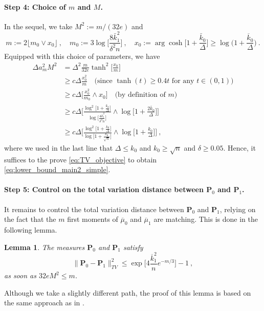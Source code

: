 \documentclass[twoside,11pt]{article}
\newtheorem{lem}{Lemma}
\def\beq{\begin{equation}}
\def\eeq{\end{equation}}
\newcommand{\<}{\langle}
\renewcommand{\>}{\rangle}
\begin{document}
\paragraph{Step 4: Choice of $m$ and $M$.}



In the sequel, we take $M^2:=m/(32 e)$ and 
\beq\label{eq:choiseM_k0_grand}
m:= 2 \lfloor m_0\vee x_0\rfloor \ , \quad  m_0 := 3\log\Big[\frac{8  \bar{k}^2_1}{\delta^2  n} \Big]\ ,\quad x_0:= \arg\cosh\big[1+ \frac{\bar{k}_0}{\Delta}\Big]\geq \log\big(1+\frac{\overline{k}_0}{\Delta}\big)\ . 
\eeq
Equipped with this choice of parameters, we have
\begin{align*}
\Delta a^2_{m}M^2&=  \Delta^2 \frac{m}{32e}\tanh^2\big[\frac{x_0}{m}\big]\nonumber\\
&\geq  c \Delta \frac{x^2_0}{m} \quad \text{(since $\tanh(t)\geq 0.4 t$ for any $t\in (0,1)$)}\nonumber\\
&\geq  c \Delta \big[\frac{x_0^2}{m_0}\wedge x_0\big]\quad \text{(by definition of $m$)}\nonumber\\
&\geq  c\Delta \Big[\frac{\log^2\big[1+  \frac{\overline{k}_0}{\Delta}\big]}{\log\big[ \frac{4  \overline{k}^2_1}{\delta^2  n}\big]}\wedge \log\big[1+ \frac{2\overline{k}_0}{\Delta}\big] \Big] \nonumber\\
&\geq  c\Delta \Big[\frac{\log^2\big[1+  \frac{k_0}{\Delta}\big]}{\log\big[1+ \frac{k_0}{ \sqrt{n}}\big]}\wedge \log\big[1+ \frac{k_0}{\Delta}\big] \Big]\ ,\label{eq.parmchoice}
\end{align*}
where we used in the last line that $\Delta\leq k_0$ and $k_0\geq \sqrt{n}$ and $\delta\geq 0.05$. Hence, it suffices to the prove \eqref{eq:TV_objective} to obtain  \eqref{eq:lower_bound_main2_simple}.




















\paragraph{Step 5: Control on the total variation distance between $\mathbf  P_0$ and $\mathbf  P_1$.}

It remains to control the total variation distance between $\mathbf  P_0$ and $\mathbf  P_1$, relying on the fact that the $m$ first moments of $\overline{\mu}_0$ and $\overline{\mu}_1$ are matching. This is done in the following lemma. 
\begin{lem}\label{lem:upper_total_variation_distance}
The measures ${\mathbf P}_0$ and ${\mathbf P}_1$ satisfy
\beq
\|{\mathbf P}_0 - {\mathbf P}_1\|_{TV}^2 \leq  \exp\Big[4\frac{ \overline{k}_1^2}{ n} e^{-m/3}\Big] - 1\ ,
\label{eq:TV2}
\eeq
as soon as $32eM^2\leq m$.
\end{lem}
 Although we take a slightly different path, the proof of this lemma is based on the same approach as in \cite{cailow2011}.
 
\end{document}
